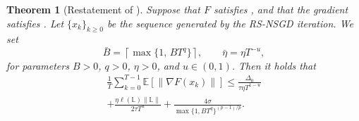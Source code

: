 \documentclass[10pt]{article}
\newtheorem{theorem}{Theorem}[section]
\begin{document}
\begin{theorem}[Restatement of ]
\label{app:Lsmoothrnsgd}
Suppose that $F$ satisfies  
, and that the gradient  
satisfies .
Let $\{x_k\}_{k\ge 0}$ be the sequence generated by the RS-NSGD iteration.
We set
\[
\bar{B} = \left\lceil \max\{1,\, B T^q\} \right\rceil,
\qquad
\bar{\eta} = \eta T^{-u},
\]
for parameters $B > 0$, $q > 0$, $\eta > 0$, and $u \in (0,1)$.
Then it holds that
\begin{align*}
\frac{1}{T} \sum_{k=0}^{T-1} \mathbb{E}[\|\nabla F(x_k)\|]
\le
\frac{\Delta_0}{\tau \eta T^{1-u}}
\\ + \frac{\eta \ell(\mathbb{L})\|\mathbb{L}\|}{2\tau T^u}
+ \frac{4\sigma}{\max\{1,BT^q\}^{(p-1)/p}}.
\end{align*}\end{theorem}
\end{document}
